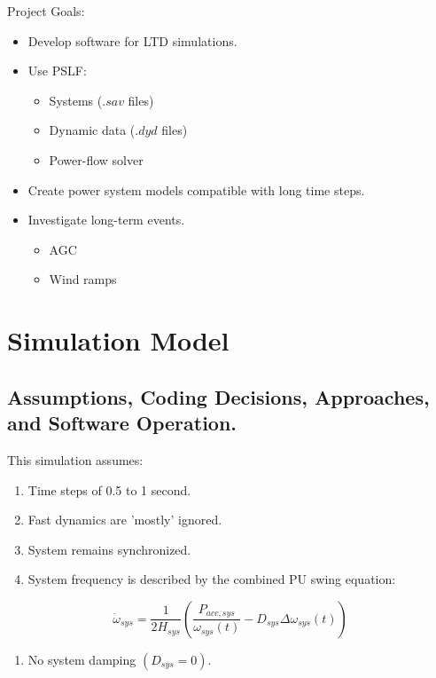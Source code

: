 \documentclass[14pt, unknownkeysallowed]{beamer}
\newcounter{assumptions}
\begin{document}
\begin{frame}
Project Goals:
\begin{itemize}
	\item Develop software for LTD simulations.
	\item Use PSLF:
	\begin{itemize}
		\item Systems ($.sav$ files)
		\item Dynamic data ($.dyd$ files)
		\item Power-flow solver
	\end{itemize}
	\item Create power system models compatible with long time steps.
	\item Investigate long-term events.
	\begin{itemize}
		\item AGC
		\item Wind ramps
	\end{itemize}
\end{itemize}
\end{frame}

\section{Simulation Model}
\subsection{Assumptions, Coding Decisions, Approaches, and Software Operation.}
\begin{frame}
This simulation assumes:
\begin{enumerate}
\item Time steps of 0.5 to 1 second.
\item Fast dynamics are 'mostly' ignored.
\item System remains synchronized.
\item System frequency is described by the combined PU swing equation:
\setcounter{assumptions}{\value{enumi}} %
\end{enumerate}
\[ \dot{\omega}_{sys} = \dfrac{1}{2H_{sys} } \left( \dfrac{P_{acc, sys} }{\omega_{sys}(t)} - D_{sys}\Delta\omega_{sys}(t)  \right)\] 
\begin{enumerate}
\setcounter{enumi}{\value{assumptions}}
\item No system damping $(D_{sys} = 0)$.
\end{enumerate}
\end{frame}
\end{document}
